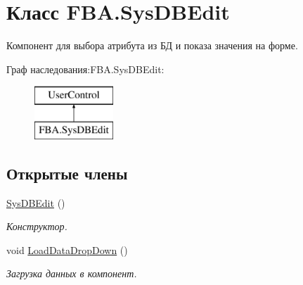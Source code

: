 \hypertarget{class_f_b_a_1_1_sys_d_b_edit}{}\section{Класс F\+B\+A.\+Sys\+D\+B\+Edit}
\label{class_f_b_a_1_1_sys_d_b_edit}


Компонент для выбора атрибута из БД и показа значения на форме.  


Граф наследования\+:F\+B\+A.\+Sys\+D\+B\+Edit\+:\begin{figure}[H]
\begin{center}
\leavevmode
\includegraphics[height=2.000000cm]{class_f_b_a_1_1_sys_d_b_edit}
\end{center}
\end{figure}
\subsection*{Открытые члены}
\begin{DoxyCompactItemize}
\item 
\mbox{\hyperlink{class_f_b_a_1_1_sys_d_b_edit_afb61c970db1b5f88eb9c1edf6de88763}{Sys\+D\+B\+Edit}} ()
\begin{DoxyCompactList}\small\item\em Конструктор. \end{DoxyCompactList}\item 
void \mbox{\hyperlink{class_f_b_a_1_1_sys_d_b_edit_a5143b157d4887de2b81e15dee6494717}{Load\+Data\+Drop\+Down}} ()
\begin{DoxyCompactList}\small\item\em Загрузка данных в компонент. \end{DoxyCompactList}\end{DoxyCompactItemize}
